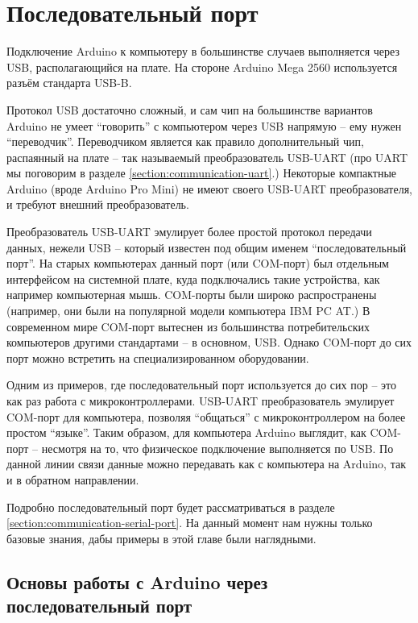 \documentclass[../sparc.tex]{subfiles}
\begin{document}
\section{Последовательный порт}
\label{section:serial-port}

Подключение Arduino к компьютеру в большинстве случаев выполняется через USB,
располагающийся на плате.  На стороне Arduino Mega 2560 используется разъём
стандарта USB-B.

Протокол USB достаточно сложный, и сам чип на большинстве вариантов Arduino не
умеет ``говорить'' с компьютером через USB напрямую -- ему нужен ``переводчик''.
Переводчиком является как правило дополнительный чип, распаянный на плате -- так
называемый преобразователь USB-UART (про \gls{UART} мы поговорим в разделе
\ref{section:communication-uart}.)  Некоторые компактные Arduino (вроде Arduino
Pro Mini) не имеют своего USB-UART преобразователя, и требуют внешний
преобразователь.

Преобразователь USB-UART эмулирует более простой протокол передачи данных,
нежели USB -- который известен под общим именем ``последовательный порт''.  На
старых компьютерах данный порт (или COM-порт) был отдельным интерфейсом на
системной плате, куда подключались такие устройства, как например компьютерная
мышь.  COM-порты были широко распространены (например, они были на популярной
модели компьютера IBM PC AT.)  В современном мире COM-порт вытеснен из
большинства потребительских компьютеров другими стандартами -- в основном, USB.
Однако COM-порт до сих порт можно встретить на специализированном оборудовании.

Одним из примеров, где последовательный порт используется до сих пор -- это как
раз работа с микроконтроллерами.  USB-UART преобразователь эмулирует COM-порт
для компьютера, позволяя ``общаться'' с микроконтроллером на более простом
``языке''.  Таким образом, для компьютера Arduino выглядит, как COM-порт --
несмотря на то, что физическое подключение выполняется по USB.  По данной линии
связи данные можно передавать как с компьютера на Arduino, так и в обратном
направлении.

Подробно последовательный порт будет рассматриваться в разделе
\ref{section:communication-serial-port}.  На данный момент нам нужны только
базовые знания, дабы примеры в этой главе были наглядными.

\subsection{Основы работы с Arduino через последовательный порт}
\end{document}
